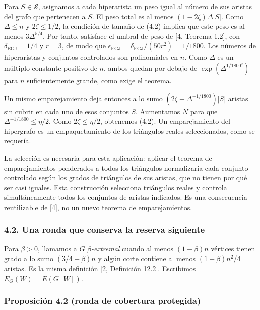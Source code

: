 \documentclass[spanish,11pt,a4paper]{article}
\providecommand{\mathscr}{\mathcal}
\begin{document}
Para \(S\in\mathscr S\), asignamos a cada hiperarista un peso igual al número de sus aristas del grafo que pertenecen a \(S\). El peso total es al menos \((1-2\zeta)\Delta|S|\). Como \(\Delta\le n\) y \(2\zeta\le1/2\), la condición de tamaño de (4.2) implica que este peso es al menos \(3\Delta^{5/4}\). Por tanto, satisface el umbral de peso de {[}4, Teorema 1.2{]}, con \(\delta_{\mathrm{EGJ}}=1/4\) y \(r=3\), de modo que \(\epsilon_{\mathrm{EGJ}}=\delta_{\mathrm{EGJ}}/(50r^2)=1/1800\). Los números de hiperaristas y conjuntos controlados son polinomiales en \(n\). Como \(\Delta\) es un múltiplo constante positivo de \(n\), ambos quedan por debajo de \(\exp(\Delta^{1/1800^2})\) para \(n\) suficientemente grande, como exige el teorema.

Un mismo emparejamiento deja entonces a lo sumo \((2\zeta+\Delta^{-1/1800})|S|\) aristas sin cubrir en cada uno de esos conjuntos \(S\). Aumentamos \(N\) para que \(\Delta^{-1/1800}\le\eta/2\). Como \(2\zeta\le\eta/2\), obtenemos (4.2). Un emparejamiento del hipergrafo es un empaquetamiento de los triángulos reales seleccionados, como se requería.

La selección es necesaria para esta aplicación: aplicar el teorema de emparejamientos ponderados a todos los triángulos normalizaría cada conjunto controlado según los grados de triángulos de sus aristas, que no tienen por qué ser casi iguales. Esta construcción selecciona triángulos reales y controla simultáneamente todos los conjuntos de aristas indicados. Es una consecuencia reutilizable de {[}4{]}, no un nuevo teorema de emparejamientos.

\subsubsection{4.2. Una ronda que conserva la reserva siguiente}\label{una-ronda-que-conserva-la-reserva-siguiente}

Para \(\beta>0\), llamamos a \(G\) \emph{\(\beta\)-extremal} cuando al menos \((1-\beta)n\) vértices tienen grado a lo sumo \((3/4+\beta)n\) y algún corte contiene al menos \((1-\beta)n^2/4\) aristas. Es la misma definición {[}2, Definición 12.2{]}. Escribimos \(E_G(W)=E(G[W])\).


\subsubsection{Proposición 4.2 (ronda de cobertura protegida)}\label{proposiciuxf3n-4.2-ronda-de-cobertura-protegida}
\end{document}
